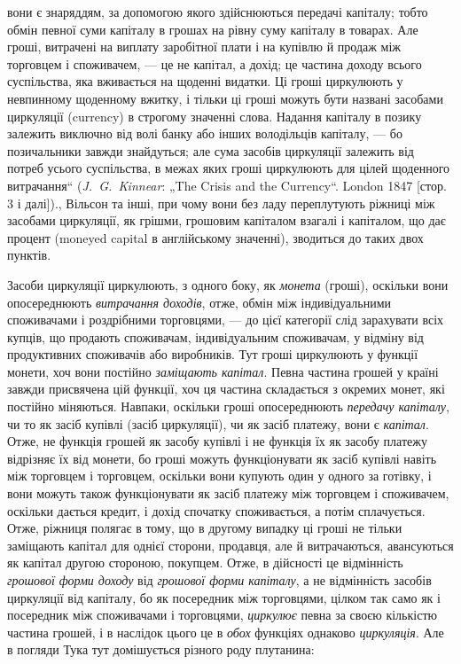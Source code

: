 {вони є знаряддям, за допомогою якого здійснюються передачі капіталу; тобто обмін певної суми
капіталу в грошах на рівну суму капіталу в товарах. Але гроші, витрачені на виплату заробітної плати
і на купівлю
й продаж між торговцем і споживачем, — це не капітал, а дохід; це частина доходу всього суспільства,
яка вживається на щоденні видатки. Ці гроші циркулюють у невпинному щоденному вжитку, і тільки ці
гроші можуть бути названі
засобами циркуляції (currency) в строгому значенні слова. Надання капіталу в
позику залежить виключно від волі банку або інших володільців капіталу, —
бо позичальники завжди знайдуться; але сума засобів циркуляції залежить від
потреб усього суспільства, в межах яких гроші циркулюють для цілей щоденного витрачання“ (\emph{J.~G.~Kinnear}: „The Crisis and the Currency“. London 1847
[стор. 3 і далі]).}, Вільсон та інші, при чому вони
без ладу переплутують ріжниці між засобами циркуляції, як грішми, грошовим капіталом взагалі і
капіталом, що дає процент (moneyed
capital в англійському значенні), зводиться до таких двох пунктів.

Засоби циркуляції циркулюють, з одного боку, як \emph{монета}
(гроші), оскільки вони опосереднюють \emph{витрачання доходів}, отже,
обмін між індивідуальними споживачами і роздрібними торговцями, — до цієї категорії слід зарахувати
всіх купців, що продають споживачам, індивідуальним споживачам, у відміну від
продуктивних споживачів або виробників. Тут гроші циркулюють
у функції монети, хоч вони постійно \emph{заміщають капітал}.
Певна частина грошей у країні завжди присвячена цій функції,
хоч ця частина складається з окремих монет, які постійно міняються. Навпаки, оскільки гроші
опосереднюють \emph{передачу капіталу}, чи то як засіб купівлі (засіб циркуляції), чи як засіб
платежу, вони є \emph{капітал}. Отже, не функція грошей як засобу
купівлі і не функція їх як засобу платежу відрізняє їх від
монети, бо гроші можуть функціонувати як засіб купівлі навіть
між торговцем і торговцем, оскільки вони купують один у одного
за готівку, і вони можуть також функціонувати як засіб платежу
між торговцем і споживачем, оскільки дається кредит, і дохід спочатку споживається, а потім
сплачується. Отже, ріжниця полягає в тому, що в другому випадку ці гроші не тільки заміщають капітал
для однієї сторони, продавця, але й витрачаються,
авансуються як капітал другою стороною, покупцем. Отже,
в дійсності це відмінність \emph{грошової форми доходу} від \emph{грошової
форми капіталу}, а не відмінність засобів циркуляції від капіталу,
бо як посередник між торговцями, цілком так само як і посередник між споживачами і торговцями,
\emph{циркулює} певна за своєю
кількістю частина грошей, і в наслідок цього це в \emph{обох} функціях однаково \emph{циркуляція}. Але в погляди
Тука тут домішується
різного роду плутанина:

